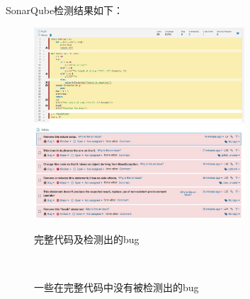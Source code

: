 \documentclass{article}
\begin{document}
\begin{enumerate}[label=\arabic*.]
\begin{lstlisting}[language=python]
        \end{lstlisting}
        SonarQube检测结果如下：\\
        \begin{figure}[H]
            \centering
            \includegraphics[width=0.7\textwidth]{fig/hw01/all_code.jpg}
            \includegraphics[width=0.7\textwidth]{fig/hw01/all_bug.jpg}
            \caption{完整代码及检测出的bug}
        \end{figure}
        \begin{figure}[H]
            \centering
            \\
            \caption{一些在完整代码中没有被检测出的bug}
        \end{figure}


\end{enumerate}
\end{document}
